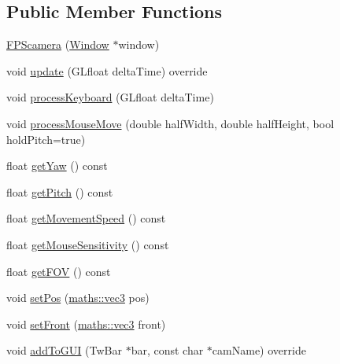 \subsection*{Public Member Functions}
\begin{DoxyCompactItemize}
\item 
\hyperlink{classspork_1_1graphics_1_1_f_p_scamera_a4f0b6c921a7bec7e9aab63d63932f9ae}{F\+P\+Scamera} (\hyperlink{classspork_1_1graphics_1_1_window}{Window} $\ast$window)
\item 
void \hyperlink{classspork_1_1graphics_1_1_f_p_scamera_afbb0ac172ef7ab075cc5ff2131c203b3}{update} (G\+Lfloat delta\+Time) override
\item 
void \hyperlink{classspork_1_1graphics_1_1_f_p_scamera_acf9ef47a0523b07a179b731dd56f094c}{process\+Keyboard} (G\+Lfloat delta\+Time)
\item 
void \hyperlink{classspork_1_1graphics_1_1_f_p_scamera_a98969ccb4077e6f71368660289d7c999}{process\+Mouse\+Move} (double half\+Width, double half\+Height, bool hold\+Pitch=true)
\item 
float \hyperlink{classspork_1_1graphics_1_1_f_p_scamera_a36b5388be9528874344a4fe791b807ed}{get\+Yaw} () const
\item 
float \hyperlink{classspork_1_1graphics_1_1_f_p_scamera_a454b2b504626eedd36cbd8d3c6500012}{get\+Pitch} () const
\item 
float \hyperlink{classspork_1_1graphics_1_1_f_p_scamera_a7c4ea5e9449a27938b6f7b1a55b6fdb7}{get\+Movement\+Speed} () const
\item 
float \hyperlink{classspork_1_1graphics_1_1_f_p_scamera_a0a3d49664541dd38ba527429c138e31a}{get\+Mouse\+Sensitivity} () const
\item 
float \hyperlink{classspork_1_1graphics_1_1_f_p_scamera_a0c7e9249a95a8b9500ea2cbe1bb81f92}{get\+F\+OV} () const
\item 
void \hyperlink{classspork_1_1graphics_1_1_f_p_scamera_a3a749cd21effcc234f433518c4390be8}{set\+Pos} (\hyperlink{structspork_1_1maths_1_1vec3}{maths\+::vec3} pos)
\item 
void \hyperlink{classspork_1_1graphics_1_1_f_p_scamera_a48c88058061e73360f56094fa49242c8}{set\+Front} (\hyperlink{structspork_1_1maths_1_1vec3}{maths\+::vec3} front)
\item 
void \hyperlink{classspork_1_1graphics_1_1_f_p_scamera_a8bf998a5b4adaab430a283ce6f6cd124}{add\+To\+G\+UI} (Tw\+Bar $\ast$bar, const char $\ast$cam\+Name) override
\end{DoxyCompactItemize}
